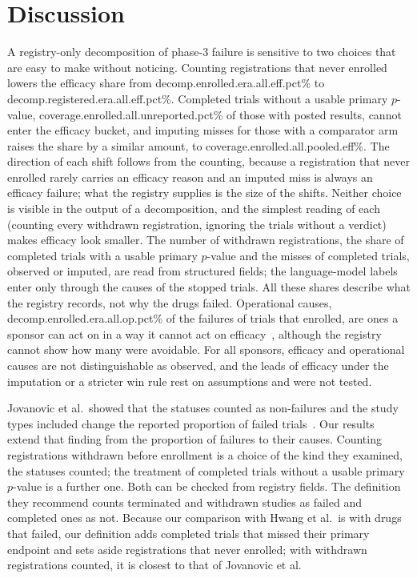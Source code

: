 \documentclass[preprint,11pt]{elsarticle}
\begin{document}
\section{Discussion}\label{sec:discussion}
A registry-only decomposition of phase-3 failure is sensitive to two choices that are easy to make without noticing. Counting registrations that never enrolled lowers the efficacy share from \num{decomp.enrolled.era.all.eff.pct}\% to \num{decomp.registered.era.all.eff.pct}\%. Completed trials without a usable primary $p$-value, \num{coverage.enrolled.all.unreported.pct}\% of those with posted results, cannot enter the efficacy bucket, and imputing misses for those with a comparator arm raises the share by a similar amount, to \num{coverage.enrolled.all.pooled.eff}\%. The direction of each shift follows from the counting, because a registration that never enrolled rarely carries an efficacy reason and an imputed miss is always an efficacy failure; what the registry supplies is the size of the shifts. Neither choice is visible in the output of a decomposition, and the simplest reading of each (counting every withdrawn registration, ignoring the trials without a verdict) makes efficacy look smaller. The number of withdrawn registrations, the share of completed trials with a usable primary $p$-value and the misses of completed trials, observed or imputed, are read from structured fields; the language-model labels enter only through the causes of the stopped trials. All these shares describe what the registry records, not why the drugs failed. Operational causes, \num{decomp.enrolled.era.all.op.pct}\% of the failures of trials that enrolled, are ones a sponsor can act on in a way it cannot act on efficacy~\cite{briel2016}, although the registry cannot show how many were avoidable. For all sponsors, efficacy and operational causes are not distinguishable as observed, and the leads of efficacy under the imputation or a stricter win rule rest on assumptions and were not tested.

Jovanovic et al.\ showed that the statuses counted as non-failures and the study types included change the reported proportion of failed trials~\cite{jovanovic2026}. Our results extend that finding from the proportion of failures to their causes. Counting registrations withdrawn before enrollment is a choice of the kind they examined, the statuses counted; the treatment of completed trials without a usable primary $p$-value is a further one. Both can be checked from registry fields. The definition they recommend counts terminated and withdrawn studies as failed and completed ones as not. Because our comparison with Hwang et al.\ is with drugs that failed, our definition adds completed trials that missed their primary endpoint and sets aside registrations that never enrolled; with withdrawn registrations counted, it is closest to that of Jovanovic et al.
\end{document}
